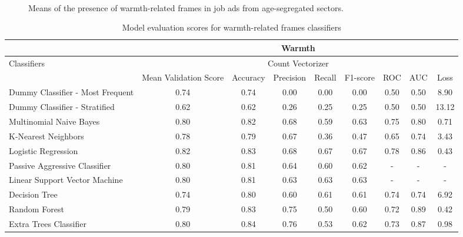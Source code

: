 \documentclass[jou]{apa7}
\begin{document}
\begin{landscape}
\begin{longtabu}
    \\
    \end{longtabu}
    \end{landscape}

\begin{figure*}
    \caption{Means of the presence of warmth-related frames in job ads from age-segregated sectors.}
    \label{figure5}
    \end{figure*}

\begin{landscape}
    \begin{longtable}[l]{lcccccccc}
    \caption{Model evaluation scores for warmth-related frames classifiers}
    \label{table10}
    \hline
    & \multicolumn{8}{c}{Warmth} \\ \hline
    \endhead
    \multirow{2}{*}{Classifiers} & \multicolumn{8}{c}{Count Vectorizer} \\ \cline{2-9}
    & Mean   Validation Score & Accuracy & Precision & Recall & F1-score & ROC & AUC & Loss \\ \hline
    Dummy Classifier - Most   Frequent & 0.74 & 0.74 & 0.00 & 0.00 & 0.00 & 0.50 & 0.50 & 8.90 \\
    Dummy Classifier - Stratified & 0.62 & 0.62 & 0.26 & 0.25 & 0.25 & 0.50 & 0.50 & 13.12 \\
    Multinomial Naive Bayes & 0.80 & 0.82 & 0.68 & 0.59 & 0.63 & 0.75 & 0.80 & 0.71 \\
    K-Nearest Neighbors & 0.78 & 0.79 & 0.67 & 0.36 & 0.47 & 0.65 & 0.74 & 3.43 \\
    Logistic Regression & 0.82 & 0.83 & 0.68 & 0.67 & 0.67 & 0.78 & 0.86 & 0.43 \\
    Passive Aggressive Classifier & 0.80 & 0.81 & 0.64 & 0.60 & 0.62 & - & - & - \\
    Linear Support Vector Machine & 0.80 & 0.81 & 0.63 & 0.63 & 0.63 & - & - & - \\
    Decision Tree & 0.74 & 0.80 & 0.60 & 0.61 & 0.61 & 0.74 & 0.74 & 6.92 \\
    Random Forest & 0.79 & 0.83 & 0.75 & 0.50 & 0.60 & 0.72 & 0.89 & 0.42 \\
    Extra Trees Classifier & 0.80 & 0.84 & 0.76 & 0.53 & 0.62 & 0.73 & 0.87 & 0.98 \\

\end{longtable}
\end{landscape}
\end{document}
